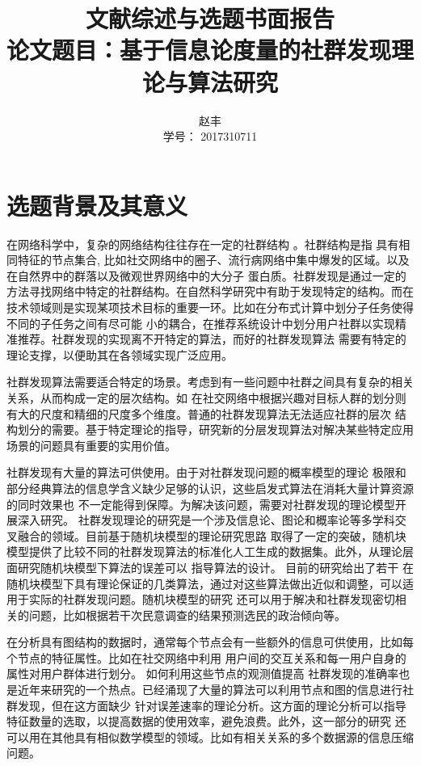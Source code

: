 \documentclass{ctexart}
\title{文献综述与选题书面报告 \\ \normalsize{论文题目：基于信息论度量的社群发现理论与算法研究 }
}
\author{赵丰 \\ 学号： 2017310711}
\begin{document}
\maketitle
\section{选题背景及其意义}
在网络科学中，复杂的网络结构往往存在一定的社群结构 \cite{fortunato2010community} 。社群结构是指
具有相同特征的节点集合,
比如社交网络中的圈子、流行病网络中集中爆发的区域。以及在自然界中的群落以及微观世界网络中的大分子
蛋白质。社群发现是通过一定的方法寻找网络中特定的社群结构。在自然科学研究中有助于发现特定的结构。而在
技术领域则是实现某项技术目标的重要一环。比如在分布式计算中划分子任务使得不同的子任务之间有尽可能
小的耦合，在推荐系统设计中划分用户社群以实现精准推荐。社群发现的实现离不开特定的算法，而好的社群发现算法
需要有特定的理论支撑，以便助其在各领域实现广泛应用。

社群发现算法需要适合特定的场景。考虑到有一些问题中社群之间具有复杂的相关关系，从而构成一定的层次结构。如
在社交网络中根据兴趣对目标人群的划分则有大的尺度和精细的尺度多个维度。普通的社群发现算法无法适应社群的层次
结构划分的需要。基于特定理论的指导，研究新的分层发现算法对解决某些特定应用场景的问题具有重要的实用价值。

社群发现有大量的算法可供使用。由于对社群发现问题的概率模型的理论
极限和部分经典算法的信息学含义缺少足够的认识，这些启发式算法在消耗大量计算资源的同时效果也
不一定能得到保障。为解决该问题，需要对社群发现的理论模型开展深入研究。
社群发现理论的研究是一个涉及信息论、图论和概率论等多学科交叉融合的领域。目前基于随机块模型的理论研究思路
取得了一定的突破，随机块模型提供了比较不同的社群发现算法的标准化人工生成的数据集。此外，从理论层面研究随机块模型下算法的误差可以
指导算法的设计。
目前的研究给出了若干
在随机块模型下具有理论保证的几类算法，通过对这些算法做出近似和调整，可以适用于实际的社群发现问题。随机块模型的研究
还可以用于解决和社群发现密切相关的问题，比如根据若干次民意调查的结果预测选民的政治倾向等。

在分析具有图结构的数据时，通常每个节点会有一些额外的信息可供使用，比如每个节点的特征属性。比如在社交网络中利用
用户间的交互关系和每一用户自身的属性对用户群体进行划分。
如何利用这些节点的观测值提高
社群发现的准确率也是近年来研究的一个热点。已经涌现了大量的算法可以利用节点和图的信息进行社群发现，但在这方面缺少
针对误差速率的理论分析。这方面的理论分析可以指导特征数量的选取，以提高数据的使用效率，避免浪费。此外，这一部分的研究
还可以用在其他具有相似数学模型的领域。比如有相关关系的多个数据源的信息压缩问题。
\end{document}
